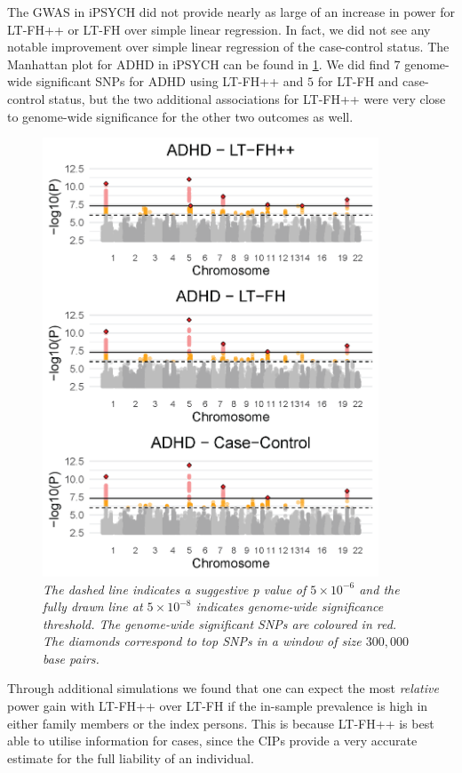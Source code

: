 The GWAS in iPSYCH did not provide nearly as large of an increase in power for LT-FH++ or LT-FH over simple linear regression. In fact, we did not see any notable improvement over simple linear regression of the case-control status. The Manhattan plot for ADHD in iPSYCH can be found in \cref{fig:LTFH++_manhattanADHD}. We did find $ 7 $ genome-wide significant SNPs for ADHD using LT-FH++ and $ 5 $ for LT-FH and case-control status, but the two additional associations for LT-FH++ were very close to genome-wide significance for the other two outcomes as well.
\begin{figure}
	\includegraphics[width=10cm]{results/manhattanPlot_ADHD.png}
	\caption[Manhattan plots for LT-FH++, LT-FH, and case-control GWAS of ADHD in the iPSYCH data]{
		\sl The dashed line indicates a suggestive p value of $ 5\times 10^{-6} $ and the fully drawn line at $ 5\times 10^{-8} $ indicates genome-wide significance threshold. The genome-wide significant SNPs are coloured in red. The diamonds correspond to top SNPs in a window of size $ 300,000 $ base pairs.}	
	\label{fig:LTFH++_manhattanADHD}
\end{figure}
Through additional simulations we found that one can expect the most \textit{relative} power gain with LT-FH++ over LT-FH if the in-sample prevalence is high in either family members or the index persons. This is because LT-FH++ is best able to utilise information for cases, since the CIPs provide a very accurate estimate for the full liability of an individual.